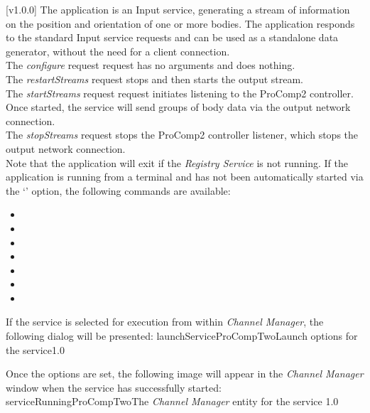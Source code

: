 [v1.0.0]
The  application is an Input service,
generating a stream of information on the position and orientation of one or more bodies.
The application responds to the standard Input service requests and can be used as a
standalone data generator, without the need for a client connection.\\

The \emph{configure} request request has no arguments and does nothing.\\

The \emph{restartStreams} request stops and then starts the output stream.\\

The \emph{startStreams} request request initiates listening to the ProComp2 controller.
Once started, the service will send groups of body data via the output \yarp{} network
connection.\\

The \emph{stopStreams} request stops the ProComp2 controller listener, which stops the
output \yarp{} network connection.\\ 

Note that the application will exit if the \emph{Registry Service} is not running.
\insertAppParameters
\insertTagDescription{\PCtwoI}
\insertInputServiceComment
\condPage{}
If the application is running from a terminal and has not been automatically started via
the `' option, the following commands are available:
\begin{itemize}
\item{}
\item\exSp{}
\item\exSp{}
\item\exSp{}
\item\exSp{}
\item\exSp{}
\item\exSp{}
\end{itemize}
\secondaryEnd
\condPage
{}
If the service is selected for execution from within \emph{Channel Manager}, the following
dialog will be presented:
%
{launchServiceProCompTwo}{Launch options for the \PCtwoI{} service}{1.0}

Once the options are set, the following image will appear in the \emph{Channel Manager}
window when the service has successfully started:
%
{serviceRunningProCompTwo}{The \emph{Channel Manager} entity for the \PCtwoI{} service}%
{1.0}
\secondaryEnd
\primaryEnd{}
